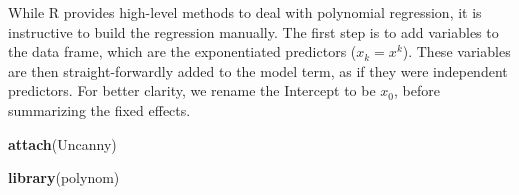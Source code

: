 \documentclass[]{svmono}
\newenvironment{Shaded}{\begin{snugshade}}{\end{snugshade}}
\newcommand{\KeywordTok}[1]{\textcolor[rgb]{0.13,0.29,0.53}{\textbf{#1}}}
\newcommand{\DataTypeTok}[1]{\textcolor[rgb]{0.13,0.29,0.53}{#1}}
\newcommand{\DecValTok}[1]{\textcolor[rgb]{0.00,0.00,0.81}{#1}}
\newcommand{\StringTok}[1]{\textcolor[rgb]{0.31,0.60,0.02}{#1}}
\newcommand{\CommentTok}[1]{\textcolor[rgb]{0.56,0.35,0.01}{\textit{#1}}}
\newcommand{\OperatorTok}[1]{\textcolor[rgb]{0.81,0.36,0.00}{\textbf{#1}}}
\newcommand{\NormalTok}[1]{#1}
\theoremstyle{definition}
\theoremstyle{definition}
\theoremstyle{definition}
\theoremstyle{remark}
\begin{document}
While R provides high-level methods to deal with polynomial regression,
it is instructive to build the regression manually. The first step is to
add variables to the data frame, which are the exponentiated predictors
(\(x_k = x^k\)). These variables are then straight-forwardly added to
the model term, as if they were independent predictors. For better
clarity, we rename the Intercept to be \(x_0\), before summarizing the
fixed effects.

\begin{Shaded}
\begin{Highlighting}[]
\KeywordTok{attach}\NormalTok{(Uncanny)}
\end{Highlighting}
\end{Shaded}

\begin{Shaded}
\end{Shaded}

\begin{Shaded}
\end{Shaded}

\begin{Shaded}
\begin{Highlighting}[]
\KeywordTok{library}\NormalTok{(polynom)}
\end{Highlighting}
\end{Shaded}
\end{document}
